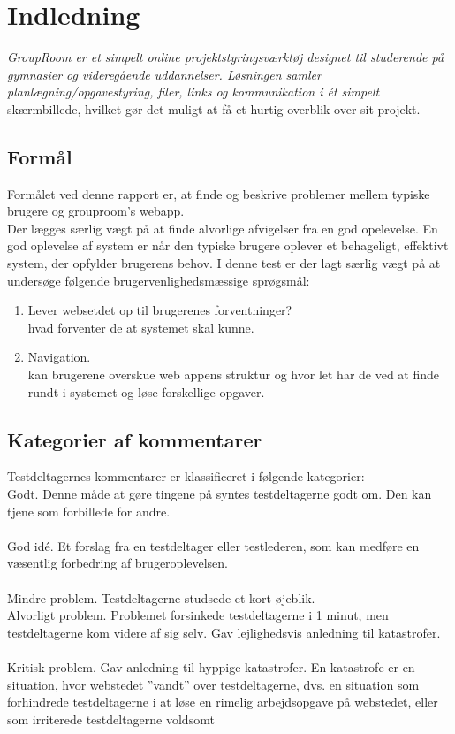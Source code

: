 \documentclass[12pt]{article}
\begin{document}
\section{Indledning}
\textit{
GroupRoom er et simpelt online projektstyringsværktøj designet til studerende på gymnasier og
videregående uddannelser. Løsningen samler planlægning/opgavestyring, filer, links og kommunikation i ét simpelt}
skærmbillede, hvilket gør det muligt at få et hurtig overblik over sit projekt.
\subsection{Formål}
Formålet ved denne rapport er, at finde og beskrive problemer mellem typiske brugere og grouproom's webapp. \\
Der lægges særlig vægt på at finde alvorlige afvigelser fra en god opelevelse. En god oplevelse af system er når den typiske brugere oplever et behageligt, effektivt system, der opfylder brugerens behov. I denne test er der lagt særlig vægt på at undersøge følgende brugervenlighedsmæssige sprøgsmål:
\begin{enumerate}
  \item Lever websetdet op til brugerenes forventninger? \\
        hvad forventer de at systemet skal kunne.
  \item Navigation. \\
        kan brugerene overskue web appens struktur og hvor let har de ved at finde rundt i systemet og løse forskellige opgaver.
\end{enumerate}
\subsection*{Kategorier af kommentarer}
Testdeltagernes kommentarer er klassificeret i følgende kategorier: \\
Godt. Denne måde at gøre tingene på syntes testdeltagerne godt om. Den kan tjene som
forbillede for andre. \\
\\
\noindent God idé. Et forslag fra en testdeltager eller testlederen, som kan medføre en væsentlig
forbedring af brugeroplevelsen. \\\\
\noindent Mindre problem. Testdeltagerne studsede et kort øjeblik.  \\
\noindent Alvorligt problem. Problemet forsinkede testdeltagerne i 1 minut, men testdeltagerne
kom videre af sig selv. Gav lejlighedsvis anledning til katastrofer. \\ \\
\noindent Kritisk problem. Gav anledning til hyppige katastrofer. En katastrofe er en situation, hvor
webstedet ”vandt” over testdeltagerne, dvs. en situation som forhindrede testdeltagerne i at
løse en rimelig arbejdsopgave på webstedet, eller som irriterede testdeltagerne voldsomt
\end{document}
